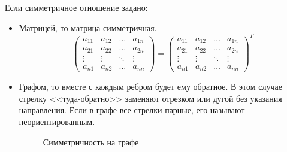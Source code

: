 \documentclass[russian]{lecture-notes}
\theoremstyle{definition}
\begin{document}
Если симметричное отношение задано:
\begin{itemize}
	\item Матрицей, то матрица симметричная.
	\begin{equation*}
	\left(
	\begin{array}{cccc}
	a_{11} & a_{12} & \ldots & a_{1n}\\
	a_{21} & a_{22} & \ldots & a_{2n}\\
	\vdots & \vdots & \ddots & \vdots\\
	a_{n1} & a_{n2} & \ldots & a_{nn}
	\end{array}
	\right) 
	= 
	\left(
	\begin{array}{cccc}
	a_{11} & a_{12} & \ldots & a_{1n}\\
	a_{21} & a_{22} & \ldots & a_{2n}\\
	\vdots & \vdots & \ddots & \vdots\\
	a_{n1} & a_{n2} & \ldots & a_{nn}
	\end{array}
	\right)^T
	\end{equation*}
	
	\item Графом, то вместе с каждым ребром будет ему обратное. В этом случае стрелку <<туда-обратно>> заменяют отрезком или дугой без указания направления. Если в графе все стрелки парные, его называют \underline{неориентированным}.
	\begin{figure}[H]
		\begin{subfigure}[H]{0.49\linewidth}
			\centering
			\label{fig:simmetr1}
		\end{subfigure}
		\hfill
		\begin{subfigure}[H]{0.49\linewidth}
			\centering
			\label{fig:simmetr2}
		\end{subfigure}
	\caption{\small Симметричность на графе}
	\label{fig:simmetr}
	\end{figure}
\end{itemize}
\end{document}
